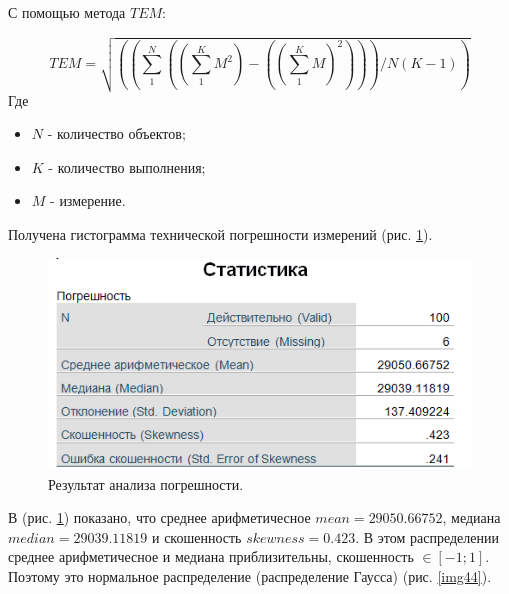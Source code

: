 С помощью метода $TEM$:

	\begin{equation}\label{eq50}
TEM=\sqrt{\left(\left(\sum_1^N\left(\left(\sum_1^K M^2\right)-\left(\left(\sum_1^K M\right)^2\right)\right)\right)/N\left(K-1\right)\right)}
\end{equation}
Где

\begin{itemize}
	\item $N$ - количество объектов;
	\item $K$ - количество выполнения;
	\item $M$ - измерение.
\end{itemize}

Получена гистограмма технической погрешности измерений (рис. \ref{img45}).

\begin{figure}[ht!]
\centering
\includegraphics [scale=1] {images/h45.png}
\begin{center}
\caption{Результат анализа погрешности.} \label{img45}
\end{center}
\end{figure}

В (рис. \ref{img45}) показано, что среднее арифметичесное $mean = 29050.66752$, медиана $median = 29039.11819$ и скошенность $skewness= 0.423$. В этом распределении среднее арифметичесное и медиана приблизительны, скошенность $\in \left[-1;1\right]$. Поэтому это нормальное распределение (распределение Гаусса) (рис. \ref{img44}).

